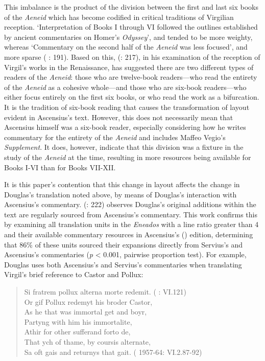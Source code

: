 \documentclass{dhbenelux}
\begin{document}
This imbalance is the product of the division between the first and last
six books of the \emph{Aeneid} which has become codified in critical
traditions of Virgilian reception. `Interpretation of Books I through VI
followed the outlines established by ancient commentaries on Homer's
\emph{Odyssey}', and tended to be more weighty, whereas `Commentary on
the second half of the \emph{Aeneid} was less focused', and more sparse
(\citeauthor{wilsonokamura2010} \citeyear{wilsonokamura2010}: 191). Based on this, \citeauthor{wilsonokamura2010} (\citeyear{wilsonokamura2010}:
217), in his examination of the reception of Virgil's works in the
Renaissance, has suggested there are two different types of readers of
the \emph{Aeneid}: those who are twelve-book readers---who read the
entirety of the \emph{Aeneid} as a cohesive whole---and those who are
six-book readers---who either focus entirely on the first six books, or
who read the work as a bifurcation. It is the tradition of six-book
reading that causes the transformation of layout evident in Ascensius's
text. However, this does not necessarily mean that Ascensius himself was
a six-book reader, especially considering how he writes commentary for
the entirety of the \emph{Aeneid} and includes Maffeo Vegio's
\emph{Supplement}. It does, however, indicate that this division was a
fixture in the study of the \emph{Aeneid} at the time, resulting in more
resources being available for Books I-VI than for Books VII-XII.

It is this paper's contention that this change in layout affects the
change in Douglas's translation noted above, by means of Douglas's
interaction with Ascensius's commentary. \citeauthor{bawcutt1973} (\citeyear{bawcutt1973}: 222) observes
Douglas's original additions within the text are regularly sourced from
Ascensius's commentary. This work confirms this by examining all
translation units in the \emph{Eneados} with a line ratio greater than 4
and their available commentary resources in Ascensius's (\citeyear{virgil1501}) edition,
determining that 86\% of these units sourced their expansions directly
from Servius's and Ascensius's commentaries (\emph{p} \textless{} 0.001,
pairwise proportion test). For example, Douglas
uses both Ascensius's and Servius's commentaries when translating
Virgil's brief reference to Castor and Pollux:

\begin{quote}
Si fratrem pollux alterna morte redemit. (\citeauthor{virgil1501} \citeyear{virgil1501}: VI.121)\\

Or gif Pollux redemyt his broder Castor,\\
As he that was immortal get and boyr,\\
Partyng with him his immortalite,\\
Athir for other sufferand forto de,\\
That ych of thame, by coursis alternate,\\
Sa oft gais and returnys that gait. (\citeauthor{douglas1957} 1957-64: VI.2.87-92)
\end{quote}
\end{document}
